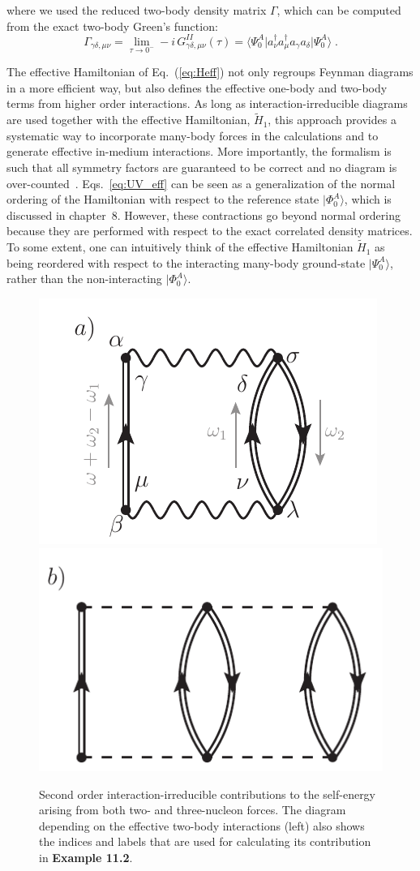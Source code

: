 where we used the reduced two-body density matrix $\Gamma$, which can be computed from the exact  two-body Green's function:
\begin{equation}
 \Gamma_{\gamma \delta, \mu \nu} = \lim_{\tau \rightarrow 0^-}  -i  \, G^{II}_{\gamma \delta, \mu \nu}(\tau) = 
     \langle\Psi^A_0\vert  a^\dagger_\nu a^\dagger_\mu  a_\gamma  a_\delta  \vert\Psi^A_0\rangle \; .
   \label{eq:2BDM}
\end{equation}


The effective Hamiltonian of Eq.~(\ref{eq:Heff})  not only regroups Feynman diagrams in 
a more efficient way, but also defines the effective one-body and two-body terms from 
higher order interactions. As long as interaction-irreducible diagrams are used together with the 
effective Hamiltonian, $\widetilde{H}_1$, this approach provides a systematic
way to incorporate many-body forces in the calculations and to 
generate effective in-medium interactions. More importantly, the formalism is such that all
symmetry factors are guaranteed to be correct and no diagram is over-counted~\cite{ch11_Carbone2013Nov}.
%
 Eqs.~\eqref{eq:UV_eff} can be seen as a generalization of the normal
ordering of the Hamiltonian with respect to the reference state $\vert\Phi_0^A\rangle$, which is discussed in chapter~8. However, these contractions go beyond normal ordering
because they are performed with respect to the exact
correlated density matrices. To some extent, one can intuitively think of 
the effective Hamiltonian $\widetilde{H}_1$  as being reordered with respect
to the interacting many-body ground-state $|\Psi_0^A\rangle$, rather than 
the non-interacting  $\vert\Phi_0^A\rangle$. 



\begin{figure}[t]
\begin{center}
\includegraphics[height=0.28\textwidth]{Chapter11-figures/fig11_3_a.pdf}   \hspace{0.06\textwidth} 
\includegraphics[height=0.28\textwidth]{Chapter11-figures/fig11_3_b.pdf}
\caption{Second order interaction-irreducible contributions to the self-energy arising from both two- and three-nucleon forces. The diagram depending on the effective two-body interactions (left) also shows the indices and labels that are used for calculating its contribution in {\bf Example 11.2}. }
\label{fig:2ndOrd}
\end{center}
\end{figure}

